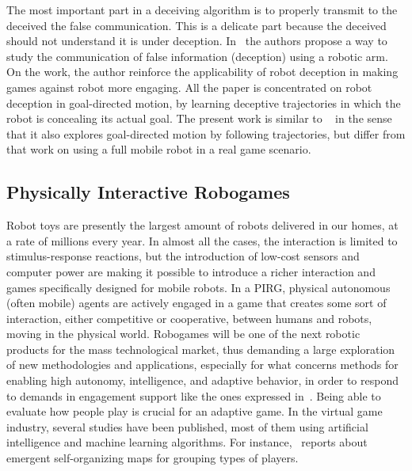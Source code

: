 The most important part in a deceiving algorithm is to properly transmit to the deceived the false communication. This is a delicate part because the deceived should not understand it is under deception. 
In~\cite{dragan2014analysis} the authors propose a way to study the communication of false information (deception) using a robotic arm. On the work, the author reinforce the applicability of robot deception in making games against robot more engaging. All the paper is concentrated on robot deception in goal-directed motion, by learning deceptive trajectories in which the robot is concealing its actual goal. The present work is similar to ~\cite{dragan2014analysis} in the sense that it also explores goal-directed motion by following trajectories, but differ from that work on using a full mobile robot in a real game scenario. 



\subsection{Physically Interactive Robogames}

Robot toys are presently the largest amount of robots delivered in our homes, at a rate of millions every year. In almost all the cases, the interaction is limited to stimulus-response reactions, but the introduction of low-cost sensors and computer power are making it possible to introduce a richer interaction and games specifically designed for mobile robots. In a PIRG, physical autonomous (often mobile) agents are actively engaged in a game that creates some sort of interaction, either competitive or cooperative, between humans and robots, moving in the physical world. Robogames will be one of the next robotic products for the mass technological market, thus demanding a large exploration of new methodologies and applications, especially for what concerns methods for enabling high autonomy, intelligence, and adaptive behavior, in order to respond to demands in engagement support like the ones expressed in~\cite{yannakakis_entertainment_2008,yannakakis_how_2008,yannakakis_real-time_2009}. 
Being able to evaluate how people play is crucial for an adaptive game. In the virtual game industry, several studies have been published, most of them using artificial intelligence and machine learning algorithms. For instance,~\cite{drachen_player_2009} reports about emergent self-organizing maps for grouping types of players. 

